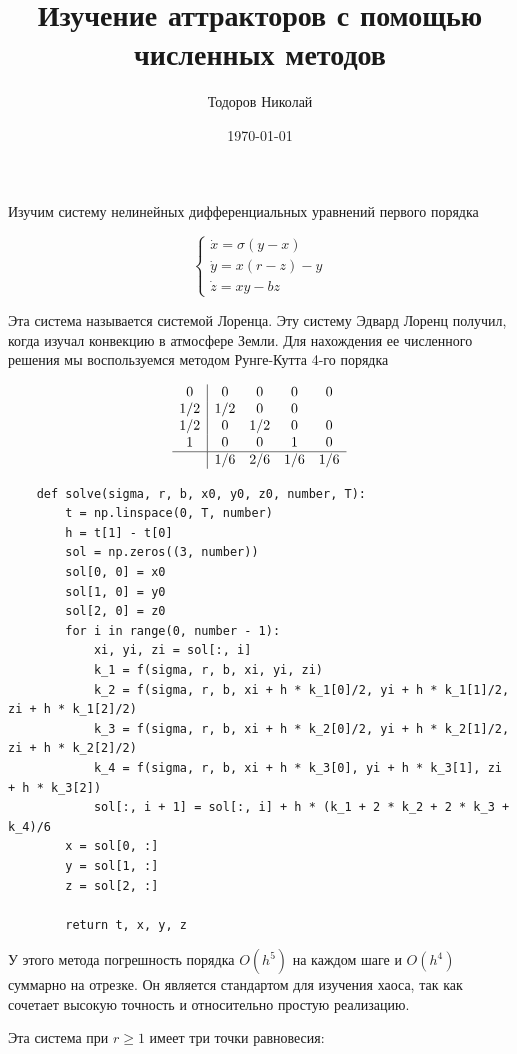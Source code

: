 \documentclass[12pt,a4paper]{article}
\title{Изучение аттракторов с помощью численных методов}
\author{Тодоров Николай}
\date{\today}
\begin{document}
	\maketitle
Изучим систему нелинейных дифференциальных уравнений первого порядка

\begin{equation}
	\begin{cases}
		\dot{x} = \sigma (y - x) \\
		\dot{y} = x(r-z) - y \\
		\dot{z} = xy - bz
	\end{cases}
\end{equation}

Эта система называется системой Лоренца. Эту систему Эдвард Лоренц получил, когда изучал конвекцию в атмосфере Земли. Для нахождения ее численного решения мы воспользуемся методом Рунге-Кутта 4-го порядка

\[
\begin{array}{c|cccc}
	0 & 0 & 0 & 0 & 0\\
	1/2 & 1/2 & 0 & 0 \\
	1/2 & 0 & 1/2 & 0 & 0 \\
	1 & 0 & 0 & 1 & 0 \\
	\hline
	& 1/6 & 2/6 & 1/6 & 1/6
\end{array}
\]

\begin{lstlisting}
	def solve(sigma, r, b, x0, y0, z0, number, T):
	    t = np.linspace(0, T, number)
	    h = t[1] - t[0]
	    sol = np.zeros((3, number))
	    sol[0, 0] = x0
	    sol[1, 0] = y0
	    sol[2, 0] = z0
	    for i in range(0, number - 1):
	        xi, yi, zi = sol[:, i]
	        k_1 = f(sigma, r, b, xi, yi, zi)
	        k_2 = f(sigma, r, b, xi + h * k_1[0]/2, yi + h * k_1[1]/2, zi + h * k_1[2]/2)
	        k_3 = f(sigma, r, b, xi + h * k_2[0]/2, yi + h * k_2[1]/2, zi + h * k_2[2]/2)
	        k_4 = f(sigma, r, b, xi + h * k_3[0], yi + h * k_3[1], zi + h * k_3[2])
	        sol[:, i + 1] = sol[:, i] + h * (k_1 + 2 * k_2 + 2 * k_3 + k_4)/6
	    x = sol[0, :]
	    y = sol[1, :]
	    z = sol[2, :]
	
	    return t, x, y, z
\end{lstlisting}

У этого метода погрешность порядка $O(h^5)$ на каждом шаге и $O(h^4)$ суммарно на отрезке. Он является стандартом для изучения хаоса, так как сочетает высокую точность и относительно простую реализацию.

Эта система при $r \ge 1$ имеет три точки равновесия:
\end{document}
